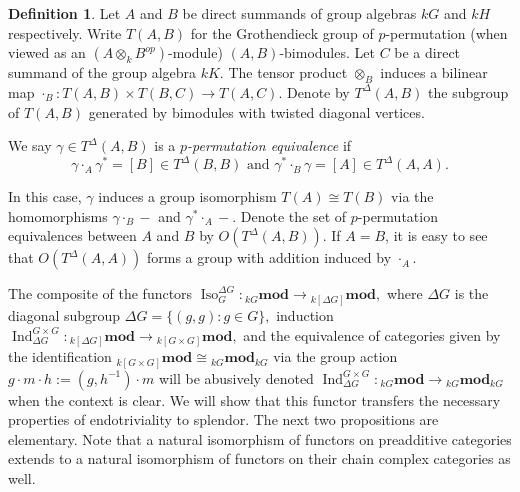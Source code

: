 \documentclass[10pt,letterpaper, boxed, cm]{amsart}
\newcommand{\inv}{^{-1}}
\newcommand{\Ind}{\operatorname{Ind}}
\newcommand{\Iso}{\operatorname{Iso}}
\theoremstyle{remark}
\theoremstyle{definition}
\newtheorem{definition}[theorem]{Definition}
\begin{document}
	\begin{definition}\label{ppermdef}
		Let $A$ and $B$ be direct summands of group algebras $kG$ and $kH$ respectively. Write $T(A,B)$ for the Grothendieck group of $p$-permutation (when viewed as an $(A\otimes_k B^{op})$-module) $(A,B)$-bimodules. Let $C$ be a direct summand of the group algebra $kK$. The tensor product $\otimes_B$ induces a bilinear map $\cdot_B: T(A,B) \times T(B,C) \to T(A,C)$. Denote by $T^\Delta(A,B)$ the subgroup of $T(A,B)$ generated by bimodules with twisted diagonal vertices.

		We say $\gamma \in T^\Delta(A,B)$ is a \textit{$p$-permutation equivalence} if
		\[\gamma \cdot_A\gamma^* = [B]\in T^\Delta(B,B) \text{ and } \gamma^* \cdot_B \gamma = [A] \in T^\Delta(A,A).\]

		In this case, $\gamma$ induces a group isomorphism $T(A) \cong T(B)$ via the homomorphisms $\gamma \cdot_B -$ and $\gamma^* \cdot_A -$. Denote the set of $p$-permutation equivalences between $A$ and $B$ by $O(T^\Delta(A,B))$. If $A = B$, it is easy to see that  $O(T^\Delta(A,A))$ forms a group with addition induced by $\cdot_A$.
	\end{definition}


	The composite of the functors $\Iso_G^{\Delta G}: {}_{kG}\mathbf{mod} \to {}_{k[\Delta G]}\mathbf{mod},$ where $\Delta G$ is the diagonal subgroup $\Delta G = \{(g,g) : g\in G\},$ induction $\Ind^{G\times G}_{\Delta G}: {}_{k[\Delta G]}\mathbf{mod} \to {}_{k[G\times G]}\mathbf{mod},$ and the equivalence of categories given by the identification $ {}_{k[G\times G]}\mathbf{mod} \cong {}_{kG}\mathbf{mod}_{kG}$ via the group action $g\cdot m\cdot h := (g,h\inv) \cdot m$ will be abusively denoted $\Ind^{G\times G}_{\Delta G}: {}_{kG}\mathbf{mod} \to {}_{kG}\mathbf{mod}_{kG}$ when the context is clear. We will show that this functor transfers the necessary properties of endotriviality to splendor. The next two propositions are elementary. Note that a natural isomorphism of functors on preadditive categories extends to a natural isomorphism of functors on their chain complex categories as well.
\end{document}

